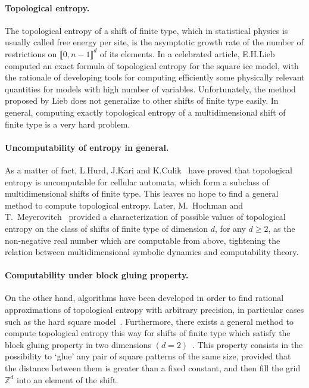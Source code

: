 \documentclass{article}
\begin{document}
\paragraph*{Topological entropy.} The topological entropy of a shift of finite type, which in statistical physics is usually called free energy per site, is the asymptotic growth rate of the number of restrictions 
on $\llbracket 0,n-1\rrbracket^d$ of its elements. In a celebrated article, E.H.Lieb~\cite{L67} computed an exact formula of topological entropy for the square ice model, with the rationale of developing tools for computing efficiently some physically relevant quantities for models with high number of variables. Unfortunately, the method proposed by Lieb does not generalize to other shifts of finite type easily. In general, computing exactly topological entropy of a multidimensional shift of finite type is a very hard problem.

\paragraph*{Uncomputability of entropy in general.}
As a matter of fact, L.Hurd, J.Kari and K.Culik~\cite{HKC92} have proved that topological entropy is uncomputable for cellular automata, which form a subclass of multidimensional shifts of finite type. This leaves no hope to find a general method to compute topological entropy. Later, M.~Hochman and T.~Meyerovitch~\cite{HM11} 
provided a characterization of possible values of topological entropy on the class of shifts of finite type of dimension $d$, for any $d \ge 2$, as the non-negative real number which are computable from above, tightening the relation between multidimensional symbolic dynamics and computability theory. 

\paragraph*{Computability under block gluing property.}
On the other hand, algorithms have been developed in order to find rational approximations of 
topological entropy with arbitrary precision, in particular cases such as the hard square model~\cite{P10}. Furthermore, there exists a general method to compute topological entropy this way for shifts of finite type 
which satisfy the block gluing property in two dimensions $(d=2)$~\cite{PS15}. This property consists in the possibility to `glue' any pair of square patterns of the same size, provided that the distance between them is greater than a fixed constant, and then fill the grid $\mathbb{Z}^d$ into an element of the shift. 
\end{document}
